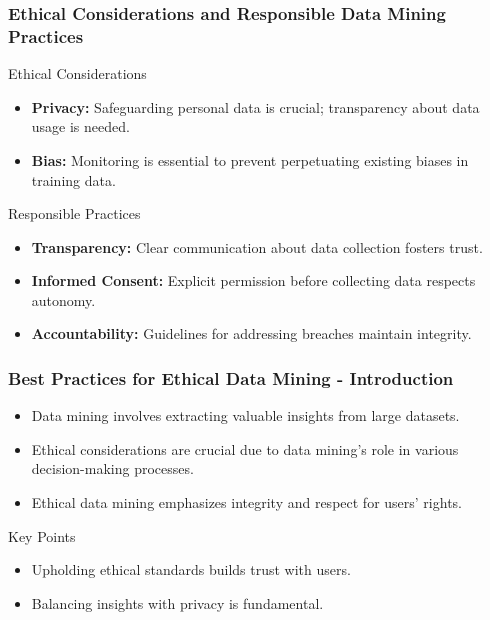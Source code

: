 \documentclass[aspectratio=169]{beamer}
\begin{document}
\begin{frame}[fragile]
    \frametitle{Ethical Considerations and Responsible Data Mining Practices}
    \begin{block}{Ethical Considerations}
        \begin{itemize}
            \item \textbf{Privacy:} Safeguarding personal data is crucial; transparency about data usage is needed.
            \item \textbf{Bias:} Monitoring is essential to prevent perpetuating existing biases in training data.
        \end{itemize}
    \end{block}
    
    \begin{block}{Responsible Practices}
        \begin{itemize}
            \item \textbf{Transparency:} Clear communication about data collection fosters trust.
            \item \textbf{Informed Consent:} Explicit permission before collecting data respects autonomy.
            \item \textbf{Accountability:} Guidelines for addressing breaches maintain integrity.
        \end{itemize}
    \end{block}
\end{frame}

\begin{frame}[fragile]
    \frametitle{Best Practices for Ethical Data Mining - Introduction}
    \begin{itemize}
        \item Data mining involves extracting valuable insights from large datasets.
        \item Ethical considerations are crucial due to data mining's role in various decision-making processes.
        \item Ethical data mining emphasizes integrity and respect for users' rights.
    \end{itemize}
    \begin{block}{Key Points}
        \begin{itemize}
            \item Upholding ethical standards builds trust with users.
            \item Balancing insights with privacy is fundamental.
        \end{itemize}
    \end{block}
\end{frame}
\end{document}
